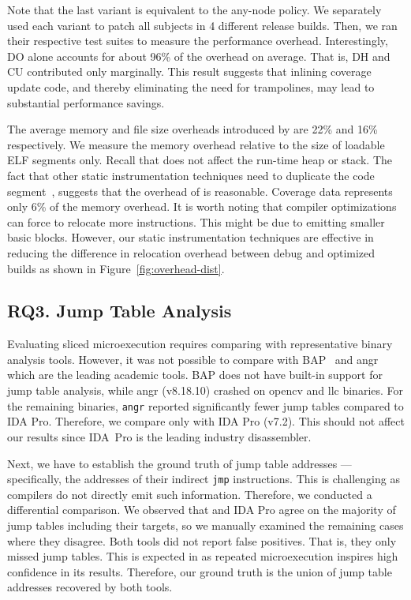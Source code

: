 Note that the last variant is equivalent to the any-node policy.
We separately used each variant to patch all subjects in 4 different release builds.
Then, we ran their respective test suites to measure the performance overhead.
Interestingly, DO alone accounts for about 96\% of the overhead on average.
That is, DH and CU contributed only marginally.
This result suggests that inlining coverage update code, and thereby eliminating the need for trampolines,  may lead to substantial performance savings.

  
The average memory and file size overheads introduced by {\bcov} are 22\% and 16\% respectively.
We measure the memory overhead relative to the size of loadable ELF segments only. 
Recall that {\bcov} does not affect the run-time heap or stack.
The fact that other static instrumentation techniques need to duplicate the code segment~\cite{Anand:EuroSys2013,Laurenzano2010}, suggests that the overhead of {\bcov} is reasonable.
Coverage data represents only 6\% of the memory overhead.
It is worth noting that compiler optimizations can force {\bcov} to relocate more instructions.
This might be due to emitting smaller basic blocks.
However, our static instrumentation techniques are effective in reducing the difference in relocation overhead between debug and optimized builds as shown in Figure~\ref{fig:overhead-dist}.


\subsection*{RQ3. Jump Table Analysis}
Evaluating sliced microexecution requires comparing {\bcov} with representative binary analysis tools.
However, it was not possible to compare with BAP~\cite{BAP:CAV2011Brumley} and \textsf{angr}~\cite{angr:Shoshitaishvili2016} which are the leading academic tools.
BAP does not have built-in support for jump table analysis, while \textsf{angr} (v8.18.10) crashed on \textsf{opencv} and \textsf{llc} binaries.
For the remaining binaries, \texttt{angr} reported significantly fewer jump tables compared to IDA Pro.
Therefore, we compare {\bcov} only with IDA Pro (v7.2).
This should not affect our results since IDA~Pro is the leading industry disassembler.

Next, we have to establish the ground truth of jump table addresses --- specifically, the addresses of their indirect \texttt{jmp} instructions.
This is challenging as compilers do not directly emit such information.
Therefore, we conducted a differential comparison.
We observed that {\bcov} and IDA Pro agree on the majority of jump tables including their targets, so we manually examined the remaining cases where they disagree.
Both tools did not report false positives.
That is, they only missed jump tables.
This is expected in {\bcov} as repeated microexecution inspires high confidence in its results.
Therefore, our ground truth is the union of jump table addresses recovered by both tools.

